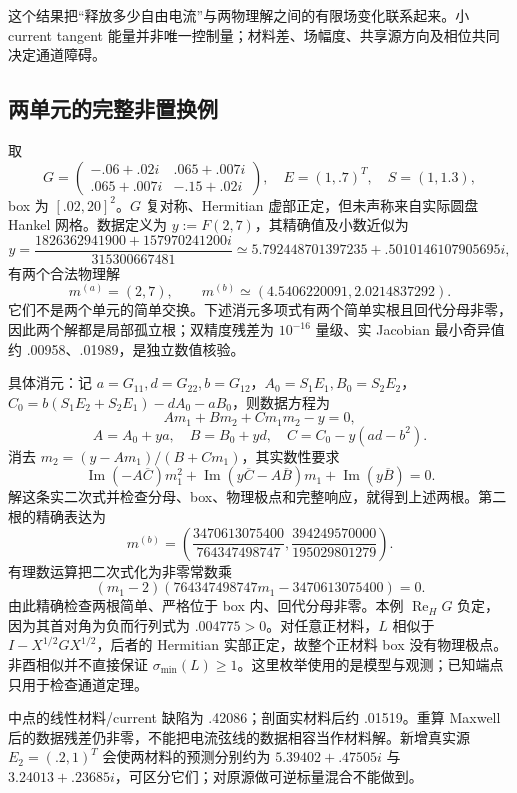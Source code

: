 \documentclass[10pt,a4paper]{article}
\begin{document}
这个结果把``释放多少自由电流''与两物理解之间的有限场变化联系起来。小
current tangent
能量并非唯一控制量；材料差、场幅度、共享源方向及相位共同决定通道障碍。

\hypertarget{ux4e24ux5355ux5143ux7684ux5b8cux6574ux975eux7f6eux6362ux4f8b}{%
\subsection{两单元的完整非置换例}\label{ux4e24ux5355ux5143ux7684ux5b8cux6574ux975eux7f6eux6362ux4f8b}}

取
\[G=\begin{pmatrix}-.06+.02i&.065+.007i\\.065+.007i&-.15+.02i\end{pmatrix},\quad
E=(1,.7)^T,\quad S=(1,1.3),\] box 为 \([.02,20]^2\)。\(G\)
复对称、Hermitian 虚部正定，但未声称来自实际圆盘 Hankel 网格。数据定义为
\(y:=F(2,7)\)，其精确值及小数近似为
\[y=\frac{1826362941900+157970241200i}{315300667481}
\simeq5.792448701397235+.5010146107905695i,\] 有两个合法物理解
\[m^{(a)}=(2,7),\qquad m^{(b)}\simeq(4.5406220091,2.0214837292).\]
它们不是两个单元的简单交换。下述消元多项式有两个简单实根且回代分母非零，因此两个解都是局部孤立根；双精度残差为
\(10^{-16}\) 量级、实 Jacobian 最小奇异值约
.00958、.01989，是独立数值核验。

具体消元：记
\(a=G_{11},d=G_{22},b=G_{12}\)，\(A_0=S_1E_1,B_0=S_2E_2\)，\(C_0=b(S_1E_2+S_2E_1)-dA_0-aB_0\)，则数据方程为
\[A m_1+B m_2+C m_1m_2-y=0,\]
\[A=A_0+ya,\quad B=B_0+yd,\quad C=C_0-y(ad-b^2).\] 消去
\(m_2=(y-Am_1)/(B+Cm_1)\)，其实数性要求
\[\operatorname{Im}(-A\overline C)m_1^2+
\operatorname{Im}(y\overline C-A\overline B)m_1+
\operatorname{Im}(y\overline B)=0.\]
解这条实二次式并检查分母、box、物理极点和完整响应，就得到上述两根。第二根的精确表达为
\[m^{(b)}=\left(\frac{3470613075400}{764347498747},\frac{394249570000}{195029801279}\right).\]
有理数运算把二次式化为非零常数乘
\[ (m_1-2)(764347498747m_1-3470613075400)=0.\]
由此精确检查两根简单、严格位于 box 内、回代分母非零。本例
\(\operatorname{Re}_H G\) 负定，因为其首对角为负而行列式为
\(.004775>0\)。对任意正材料，\(L\) 相似于 \(I-X^{1/2}GX^{1/2}\)，后者的
Hermitian 实部正定，故整个正材料 box 没有物理极点。非酉相似并不直接保证
\(\sigma_{\min}(L)\ge1\)。这里枚举使用的是模型与观测；已知端点只用于检查通道定理。

中点的线性材料/current 缺陷为 .42086；剖面实材料后约 .01519。重算
Maxwell
后的数据残差仍非零，不能把电流弦线的数据相容当作材料解。新增真实源
\(E_2=(.2,1)^T\) 会使两材料的预测分别约为 \(5.39402+.47505i\) 与
\(3.24013+.23685i\)，可区分它们；对原源做可逆标量混合不能做到。
\end{document}
